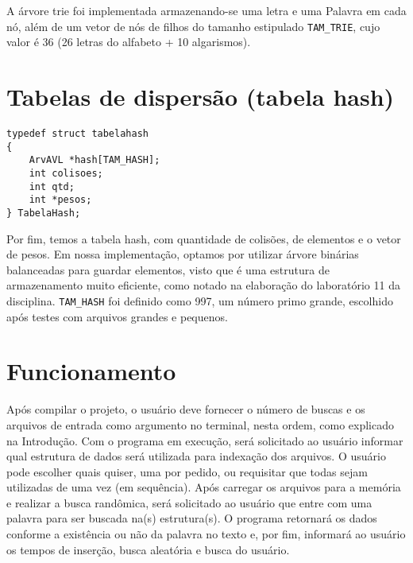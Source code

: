 A árvore trie foi implementada armazenando-se uma letra e uma Palavra em cada nó, além de um vetor de nós de filhos do tamanho estipulado \texttt{TAM\_TRIE}, cujo valor é 36 (26 letras do alfabeto + 10 algarismos).


\section{Tabelas de dispersão (tabela hash)}
\begin{lstlisting}
typedef struct tabelahash
{
    ArvAVL *hash[TAM_HASH];
    int colisoes;
    int qtd;
    int *pesos;
} TabelaHash;
\end{lstlisting}
Por fim, temos a tabela hash, com quantidade de colisões, de elementos e o vetor de pesos. Em nossa implementação, optamos por utilizar árvore binárias balanceadas para guardar elementos, visto que é uma estrutura de armazenamento muito eficiente, como notado na elaboração do laboratório 11 da disciplina. \texttt{TAM\_HASH} foi definido como 997, um número primo grande, escolhido após testes com arquivos grandes e pequenos.

\section{Funcionamento}
Após compilar o projeto, o usuário deve fornecer o número de buscas e os arquivos de entrada como argumento no terminal, nesta ordem, como explicado na Introdução. Com o programa em execução, será solicitado ao usuário informar qual estrutura de dados será utilizada para indexação dos arquivos. O usuário pode escolher quais quiser, uma por pedido, ou requisitar que todas sejam utilizadas de uma vez (em sequência). Após carregar os arquivos para a memória e realizar a busca randômica, será solicitado ao usuário que entre com uma palavra para ser buscada na(s) estrutura(s). O programa retornará os dados conforme a existência ou não da palavra no texto e, por fim, informará ao usuário os tempos de inserção, busca aleatória e busca do usuário.
